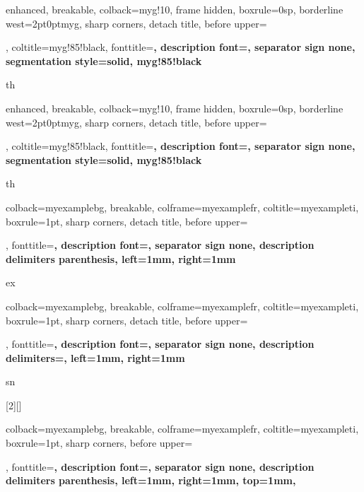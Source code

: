 {enhanced, breakable, colback=myg!10, frame hidden, boxrule=0sp,
  borderline west={2pt}{0pt}{myg}, sharp corners, detach title,
  before upper={\renewcommand{\familydefault}{\sfdefault}\selectfont\tcbtitle\par\smallskip},
  coltitle=myg!85!black, fonttitle=\bfseries\sffamily, description font=\mdseries,
  separator sign none, segmentation style={solid, myg!85!black}}{th}

{enhanced, breakable, colback=myg!10, frame hidden, boxrule=0sp,
  borderline west={2pt}{0pt}{myg}, sharp corners, detach title,
  before upper={\renewcommand{\familydefault}{\sfdefault}\selectfont\tcbtitle\par\smallskip},
  coltitle=myg!85!black, fonttitle=\bfseries\sffamily, description font=\mdseries,
  separator sign none, segmentation style={solid, myg!85!black}}{th}

{colback=myexamplebg, breakable, colframe=myexamplefr, coltitle=myexampleti,
  boxrule=1pt, sharp corners, detach title,
  before upper={\renewcommand{\familydefault}{\sfdefault}\selectfont\tcbtitle\par\smallskip},
  fonttitle=\bfseries\sffamily, description font=\mdseries,
  separator sign none, description delimiters parenthesis,
  left=1mm, %
  right=1mm %
}{ex}

{colback=myexamplebg, breakable, colframe=myexamplefr, coltitle=myexampleti,
  boxrule=1pt, sharp corners, detach title,
  before upper={\renewcommand{\familydefault}{\sfdefault}\selectfont\tcbtitle\par\smallskip},
  fonttitle=\bfseries\sffamily, description font=\mdseries,
  separator sign none, description delimiters={}, %
  left=1mm, %
  right=1mm %
}{sn}


[2][]{%
  colback=myexamplebg,
  breakable,
  colframe=myexamplefr,
  coltitle=myexampleti,
  boxrule=1pt,
  sharp corners,
  before upper={\renewcommand{\familydefault}{\sfdefault}\selectfont\tcbtitle\par\smallskip},
  fonttitle=\bfseries\sffamily,
  description font=\mdseries,
  separator sign none,
  description delimiters parenthesis,
  left=1mm, %
  right=1mm, %
  top=1mm,
}

